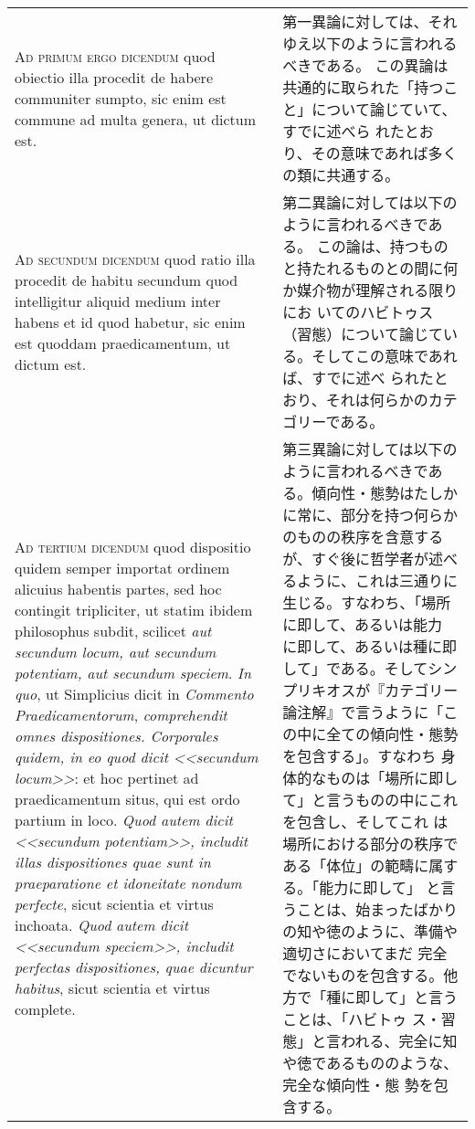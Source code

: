 \documentclass[10pt]{jsarticle} %
\begin{document}
\begin{longtable}{p{21em}p{21em}}


{\scshape Ad primum ergo dicendum} quod obiectio illa procedit de habere
communiter sumpto, sic enim est commune ad multa genera, ut dictum
est.

&

第一異論に対しては、それゆえ以下のように言われるべきである。
この異論は共通的に取られた「持つこと」について論じていて、すでに述べら
 れたとおり、その意味であれば多くの類に共通する。

\\



{\scshape Ad secundum dicendum} quod ratio illa procedit de habitu secundum quod
intelligitur aliquid medium inter habens et id quod habetur, sic enim
est quoddam praedicamentum, ut dictum est.

&

第二異論に対しては以下のように言われるべきである。
この論は、持つものと持たれるものとの間に何か媒介物が理解される限りにお
いてのハビトゥス（習態）について論じている。そしてこの意味であれば、すでに述べ
られたとおり、それは何らかのカテゴリーである。


\\



{\scshape Ad tertium dicendum} quod dispositio quidem semper importat ordinem
alicuius habentis partes, sed hoc contingit tripliciter, ut statim
ibidem philosophus subdit, scilicet {\itshape aut secundum locum, aut secundum
potentiam, aut secundum speciem}. {\itshape In quo}, ut Simplicius dicit in
{\itshape Commento Praedicamentorum}, {\itshape comprehendit omnes
dispositiones. Corporales quidem, in eo quod dicit <<secundum locum>>}: et
hoc pertinet ad praedicamentum situs, qui est ordo partium in
loco. {\itshape Quod autem dicit <<secundum potentiam>>, includit illas
dispositiones quae sunt in praeparatione et idoneitate nondum
perfecte}, sicut scientia et virtus inchoata. {\itshape Quod autem dicit <<secundum
speciem>>, includit perfectas dispositiones, quae dicuntur habitus},
sicut scientia et virtus complete.

&

第三異論に対しては以下のように言われるべきである。傾向性・態勢はたしか
に常に、部分を持つ何らかのものの秩序を含意するが、すぐ後に哲学者が述べ
るように、これは三通りに生じる。すなわち、「場所に即して、あるいは能力
に即して、あるいは種に即して」である。そしてシンプリキオスが『カテゴリー
論注解』で言うように「この中に全ての傾向性・態勢を包含する」。すなわち
身体的なものは「場所に即して」と言うものの中にこれを包含し、そしてこれ
は場所における部分の秩序である「体位」の範疇に属する。「能力に即して」
と言うことは、始まったばかりの知や徳のように、準備や適切さにおいてまだ
完全でないものを包含する。他方で「種に即して」と言うことは、「ハビトゥ
ス・習態」と言われる、完全に知や徳であるもののような、完全な傾向性・態
勢を包含する。


\\


\end{longtable}
\newpage
\end{document}
